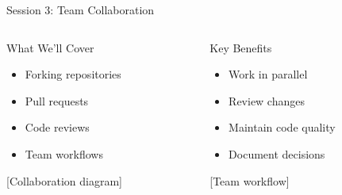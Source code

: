 \documentclass[aspectratio=169]{beamer}
\begin{document}
\begin{frame}{Session 3: Team Collaboration}
  \begin{columns}
    \begin{column}{0.48\textwidth}
      \begin{block}{What We'll Cover}
        \begin{itemize}
          \item Forking repositories
          \item Pull requests
          \item Code reviews
          \item Team workflows
        \end{itemize}
      \end{block}
      
      \begin{center}
        [Collaboration diagram]
      \end{center}
    \end{column}
    
    \begin{column}{0.48\textwidth}
      \begin{block}{Key Benefits}
        \begin{itemize}
          \item Work in parallel
          \item Review changes
          \item Maintain code quality
          \item Document decisions
        \end{itemize}
      \end{block}
      
      \begin{center}
        [Team workflow]
      \end{center}
    \end{column}
  \end{columns}
\end{frame}
\end{document}
